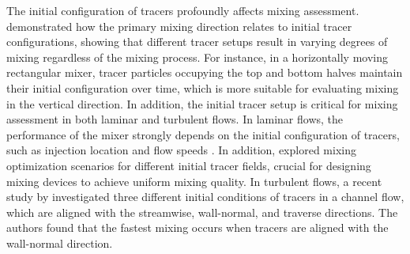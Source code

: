 \documentclass[final,3p,times,twocolumn,authoryear]{elsarticle}
\theoremstyle{definition}
\begin{document}
The initial configuration of tracers profoundly affects mixing assessment. \citet{Siiria2009} demonstrated how the primary mixing direction relates to initial tracer configurations, showing that different tracer setups result in varying degrees of mixing regardless of the mixing process. For instance, in a horizontally moving rectangular mixer, tracer particles occupying the top and bottom halves maintain their initial configuration over time, which is more suitable for evaluating mixing in the vertical direction. In addition, the initial tracer setup is critical for mixing assessment in both laminar and turbulent flows. In laminar flows, the performance of the mixer strongly depends on the initial configuration of tracers, such as injection location and flow speeds \citep{Hobbs1997,Zalc2003}. In addition, \citet{Gubanov2009} explored mixing optimization scenarios for different initial tracer fields, crucial for designing mixing devices to achieve uniform mixing quality. In turbulent flows, a recent study by \citet{Singh2023} investigated three different initial conditions of tracers in a channel flow, which are aligned with the streamwise, wall-normal, and traverse directions. The authors found that the fastest mixing occurs when tracers are aligned with the wall-normal direction.
\end{document}
